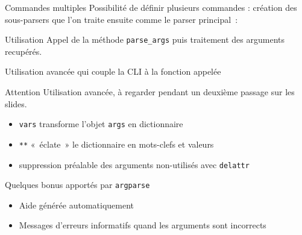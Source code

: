 \begin{frame}{Commandes multiples}
  Possibilité de définir plusieurs commandes : création des sous-parsers que l'on traite ensuite comme le parser principal~:

\end{frame}

\begin{frame}{Utilisation}
  Appel de la méthode \texttt{parse\_args} puis traitement des arguments recupérés.

\end{frame}

\begin{frame}{Utilisation avancée qui couple la CLI à la fonction appelée}
  \begin{alertblock}{Attention}
    Utilisation avancée, à regarder pendant un deuxième passage sur les slides.
  \end{alertblock}

  \begin{itemize}
    \item \texttt{vars} transforme l'objet \texttt{args} en dictionnaire
    \item \texttt{**} «~éclate~» le dictionnaire en mots-clefs et valeurs
    \item suppression préalable des arguments non-utilisés avec \texttt{delattr}
  \end{itemize}
\end{frame}

\begin{frame}{Quelques bonus apportés par \texttt{argparse}}
  \begin{itemize}[<+->]
    \item Aide générée automatiquement
    \item Messages d'erreurs informatifs quand les arguments sont incorrects
  \end{itemize}
\end{frame}
